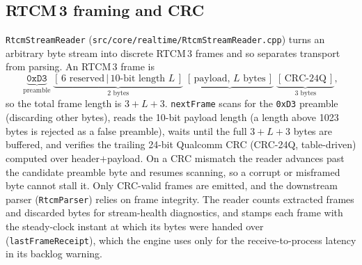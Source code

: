 \documentclass[main.tex]{subfiles}
\begin{document}
\subsection{RTCM\,3 framing and CRC}\label{sec:rt-framing}

\texttt{RtcmStreamReader} (\texttt{src/core/realtime/RtcmStreamReader.cpp})
turns an arbitrary byte stream into discrete RTCM\,3 frames and so
separates transport from parsing.  An RTCM\,3 frame is
\begin{equation}
\underbrace{\texttt{0xD3}}_{\text{preamble}}\;
\underbrace{[\,6\text{ reserved}\,|\,10\text{-bit length }L\,]}_{\text{2 bytes}}\;
\underbrace{[\,\text{payload, }L\text{ bytes}\,]}_{}\;
\underbrace{[\,\text{CRC-24Q}\,]}_{3\text{ bytes}},
\label{eq:rt-frame}
\end{equation}
so the total frame length is $3 + L + 3$.  \texttt{nextFrame} scans for
the \texttt{0xD3} preamble (discarding other bytes), reads the 10-bit
payload length (a length above 1023 bytes is rejected as a false
preamble), waits until the full $3+L+3$ bytes are buffered, and verifies
the trailing 24-bit Qualcomm CRC (CRC-24Q, table-driven) computed over
header$+$payload.  On a CRC mismatch the reader advances past the
candidate preamble byte and resumes scanning, so a corrupt or misframed
byte cannot stall it.  Only CRC-valid frames are emitted, and the
downstream parser (\texttt{RtcmParser}) relies on frame integrity.  The
reader counts extracted frames and discarded bytes for stream-health
diagnostics, and stamps each frame with the steady-clock instant at which its
bytes were handed over (\texttt{lastFrameReceipt}), which the engine uses
only for the receive-to-process latency in its backlog warning.
\end{document}
